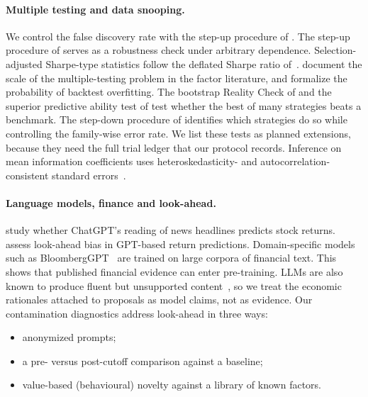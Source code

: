 \paragraph{Multiple testing and data snooping.}
We control the false discovery rate with the step-up procedure of
\citet{benjamini1995fdr}. The step-up procedure of \citet{benjamini2001fdr}
serves as a robustness check under arbitrary dependence. Selection-adjusted
Sharpe-type statistics follow the deflated Sharpe ratio
of~\citet{bailey2014deflated}. \citet{harvey2016cross} document the scale of
the multiple-testing problem in the factor literature, and
\citet{bailey2017pbo} formalize the probability of backtest overfitting. The
bootstrap Reality Check of \citet{white2000reality} and the superior
predictive ability test of \citet{hansen2005spa} test whether the best of
many strategies beats a benchmark. The step-down procedure of
\citet{romano2005stepwise} identifies which strategies do so while
controlling the family-wise error rate. We list these tests as planned
extensions, because they need the full trial ledger that our protocol
records. Inference on mean information
coefficients uses heteroskedasticity- and autocorrelation-consistent standard
errors~\citep{newey1987hac}.

\paragraph{Language models, finance and look-ahead.}
\citet{lopezlira2023chatgpt} study whether ChatGPT's reading of news headlines
predicts stock returns. \citet{glasserman2023lookahead} assess look-ahead bias
in GPT-based return predictions. Domain-specific models such as
BloombergGPT~\citep{wu2023bloomberggpt} are trained on large corpora of
financial text. This shows that published financial evidence can enter
pre-training. LLMs are also known to produce fluent but unsupported
content~\citep{ji2023hallucination}, so we treat the economic rationales
attached to proposals as model claims, not as evidence. Our contamination
diagnostics address look-ahead in three ways:
\begin{itemize}
  \item anonymized prompts;
  \item a pre- versus post-cutoff comparison against a baseline;
  \item value-based (behavioural) novelty against a library of known factors.
\end{itemize}
